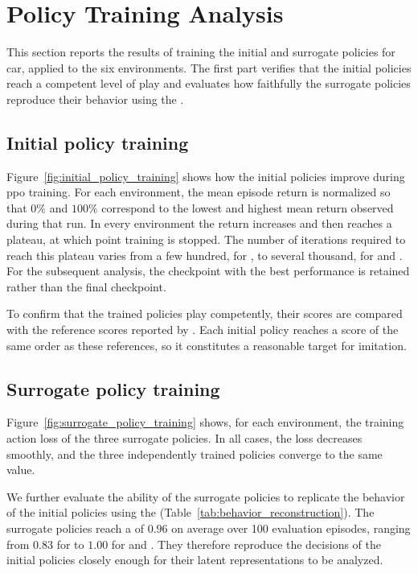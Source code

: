 \section{Policy Training Analysis}
\label{sec:experiments_policy_training_analysis}

This section reports the results of training the initial and surrogate policies for \gls{car}, applied to the six environments.
The first part verifies that the initial policies reach a competent level of play and evaluates how faithfully the surrogate policies reproduce their behavior using the \BehaviorReconstructionName.

\subsection{Initial policy training}
\label{ssec:initial_policy_training}



Figure~\ref{fig:initial_policy_training} shows how the initial policies improve during \gls{ppo} training.
For each environment, the mean episode return is normalized so that $0\%$ and $100\%$ correspond to the lowest and highest mean return observed during that run.
In every environment the return increases and then reaches a plateau, at which point training is stopped.
The number of iterations required to reach this plateau varies from a few hundred, for \PongName, to several thousand, for \SurroundName and \MsPacManName.
For the subsequent analysis, the checkpoint with the best performance is retained rather than the final checkpoint.

To confirm that the trained policies play competently, their scores are compared with the reference scores reported by \cite{machado2017revisitingarcadelearningenvironment}.
Each initial policy reaches a score of the same order as these references, so it constitutes a reasonable target for imitation.

\subsection{Surrogate policy training}
\label{ssec:surrogate_policy_training}

Figure~\ref{fig:surrogate_policy_training} shows, for each environment, the training action loss of the three surrogate policies.
In all cases, the loss decreases smoothly, and the three independently trained policies converge to the same value.

We further evaluate the ability of the surrogate policies to replicate the behavior of the initial policies using the \BehaviorReconstructionName (Table~\ref{tab:behavior_reconstruction}).
The surrogate policies reach a \BehaviorReconstructionName of $0.96$ on average over 100 evaluation episodes, ranging from $0.83$ for \BreakoutName to $1.00$ for \MsPacManName and \SurroundName.
They therefore reproduce the decisions of the initial policies closely enough for their latent representations to be analyzed.


